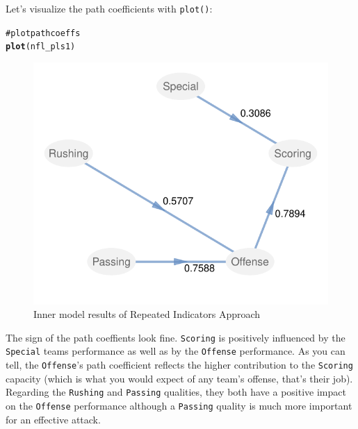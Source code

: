\documentclass[12pt]{book}\usepackage{graphicx, color}
\makeatletter
\newcommand{\hlfunctioncall}[1]{\textcolor[rgb]{0.501960784313725,0,0.329411764705882}{\textbf{#1}}}%
\newcommand{\hlcomment}[1]{\textcolor[rgb]{0.180392156862745,0.6,0.341176470588235}{#1}}%
\newenvironment{kframe}{%
 \def\at@end@of@kframe{}%
 \ifinner\ifhmode%
  \def\at@end@of@kframe{\end{minipage}}%
  \begin{minipage}{\columnwidth}%
 \fi\fi%
 \def\FrameCommand##1{\hskip\@totalleftmargin \hskip-\fboxsep
 \colorbox{shadecolor}{##1}\hskip-\fboxsep
     \hskip-\linewidth \hskip-\@totalleftmargin \hskip\columnwidth}%
 \MakeFramed {\advance\hsize-\width
   \@totalleftmargin\z@ \linewidth\hsize
   \@setminipage}}%
 {\par\unskip\endMakeFramed%
 \at@end@of@kframe}
\newenvironment{knitrout}{}{} %
\newcommand{\code}[1]{\texttt{#1}}
\makeatother
\begin{document}
Let's visualize the path coefficients with \code{plot()}:
\begin{knitrout}
\color{fgcolor}\begin{kframe}
\begin{alltt}
\hlcomment{# plot path coeffs}
\hlfunctioncall{plot}(nfl_pls1)
\end{alltt}
\end{kframe}\begin{figure}[h]


{\centering \includegraphics[width=.75\linewidth,height=.45\linewidth]{figure/nlf_poormans_path_coeff} 

}

\caption[Inner model results of Repeated Indicators Approach]{Inner model results of Repeated Indicators Approach\label{fig:nlf_poormans_path_coeff}}
\end{figure}


\end{knitrout}


The sign of the path coeffients look fine. \code{Scoring} is positively influenced by the \code{Special} teams performance as well as by the \code{Offense} performance. As you can tell, the \code{Offense}'s path coefficient reflects the higher contribution to the \code{Scoring} capacity (which is what you would expect of any team's offense, that's their job). Regarding the \code{Rushing} and \code{Passing} qualities, they both have a positive impact on the \code{Offense} performance although a \code{Passing} quality is much more important for an effective attack.
\end{document}
